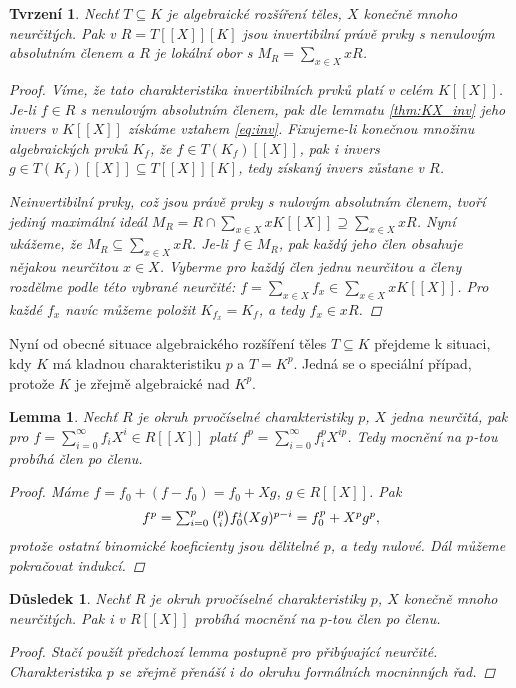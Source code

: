 \documentclass[11pt,a4paper]{article}
\newcommand*{\ml}[1]{\[\textstyle\let\displaystyle\textstyle#1\]}	%
\newcounter{numb}
\theoremstyle{definition}
\theoremstyle{plain}
\newtheorem{lemma}[numb]{Lemma}
\newtheorem{tvrzeni}[numb]{Tvrzení}
\newtheorem{dusledek}[numb]{Důsledek}
\begin{document}
\begin{tvrzeni}
	Nechť $T \subseteq K$ je algebraické rozšíření těles, $X$ konečně mnoho neurčitých. Pak v $R = T[[X]][K]$ jsou invertibilní právě prvky s nenulovým absolutním členem a $R$ je lokální obor s $M_R = \sum_{x \in X} xR$.

	\begin{proof}
		Víme, že tato charakteristika invertibilních prvků platí v celém $K[[X]]$. Je-li $f \in R$ s nenulovým absolutním členem, pak dle lemmatu \ref{thm:KX_inv} jeho invers v $K[[X]]$ získáme vztahem \eqref{eq:inv}. Fixujeme-li konečnou množinu algebraických prvků $K_f$, že $f \in T(K_f)[[X]]$, pak i invers $g \in T(K_f)[[X]] \subseteq T[[X]][K]$, tedy získaný invers zůstane v $R$.

		Neinvertibilní prvky, což jsou právě prvky s nulovým absolutním členem, tvoří jediný maximální ideál $M_R = R \cap \sum_{x \in X} x K[[X]] \supseteq \sum_{x \in X} x R$. Nyní ukážeme, že $M_R \subseteq \sum_{x \in X} xR$. Je-li $f \in M_R$, pak každý jeho člen obsahuje nějakou neurčitou $x \in X$. Vyberme pro každý člen jednu neurčitou a členy rozdělme podle této vybrané neurčité: $f = \sum_{x \in X} f_x \in \sum_{x \in X} x K[[X]]$. Pro každé $f_x$ navíc můžeme položit $K_{f_x} = K_f$, a tedy $f_x \in xR$.
	\end{proof}
\end{tvrzeni}

Nyní od obecné situace algebraického rozšíření těles $T \subseteq K$ přejdeme k situaci, kdy $K$ má kladnou charakteristiku $p$ a $T = K^p$. Jedná se o speciální případ, protože $K$ je zřejmě algebraické nad $K^p$.

\begin{lemma}
	Nechť $R$ je okruh prvočíselné charakteristiky $p$, $X$ jedna neurčitá, pak pro $f = \sum_{i = 0}^\infty f_i X^i \in R[[X]]$ platí $f^p = \sum_{i = 0}^\infty f_i^p X^{ip}$. Tedy mocnění na $p$-tou probíhá člen po členu.

	\begin{proof}
		Máme $f = f_0 + (f - f_0) = f_0 + X g$, $g \in R[[X]]$. Pak
		\ml{
			f^p = \sum_{i = 0}^p \binom{p}{i} f_0^i (X g)^{p - i} = f_0^p + X^p g^p,
		}
		protože ostatní binomické koeficienty jsou dělitelné $p$, a tedy nulové. Dál můžeme pokračovat indukcí.
	\end{proof}
\end{lemma}

\begin{dusledek} \label{thm:p_power}
	Nechť $R$ je okruh prvočíselné charakteristiky $p$, $X$ konečně mnoho neurčitých. Pak i v $R[[X]]$ probíhá mocnění na $p$-tou člen po členu.

	\begin{proof}
		Stačí použít předchozí lemma postupně pro přibývající neurčité. Charakteristika $p$ se zřejmě přenáší i do okruhu formálních mocninných řad.
	\end{proof}
\end{dusledek}
\end{document}
